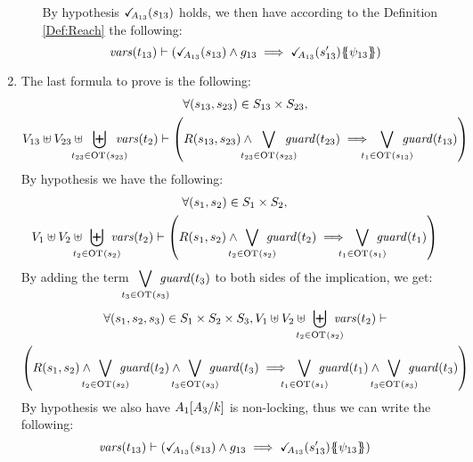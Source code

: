 \documentclass[runningheads]{llncs}
\begin{document}
\begin{enumerate}
\begin{itemize}
By hypothesis $\checkmark_{\!\! A_{13}}{\left(s_{13}\right)}$ holds,  we then have according to the Definition \ref{Def:Reach} the following:
\[ \fvars{t_{13}} \vdash \left(\reach{A_{13}}\mpar{s_{13}} \wedge g_{13} \implies \reach{A_{13}}\mpar{s_{13}'}\psubst{\psi_{13}}\right) \]	
\end{itemize}
\item The last formula to prove is the following:
\begin{multline*}
\forall \mpar{s_{13}, s_{23}} \in S_{13} \times S_{23},\\ V_{13} \uplus V_{23} \uplus \biguplus_\subbox{t_{23}\in \fOT{s_{23}}} \fvars{t_2} \vdash \left(R\mpar{s_{13}, s_{23}} \wedge \bigvee_\subbox{t_{23} \in \fOT{s_{23}}} \fguard{t_{23}} \implies \bigvee_\subbox{t_1 \in \fOT{s_{13}}} \fguard{t_{13}} \right)
\end{multline*}
By hypothesis we have the following:
\begin{multline*}
\forall \mpar{s_1, s_2} \in S_1 \times S_2,\\ V_1 \uplus V_2 \uplus \biguplus_\subbox{t_2 \in \fOT{s_2}} \fvars{t_2} \vdash \left(R\mpar{s_1, s_2} \wedge \bigvee_\subbox{t_2 \in \fOT{s_2}} \fguard{t_2} \implies \bigvee_\subbox{t_1 \in \fOT{s_1}} \fguard{t_1} \right)
\end{multline*}
By adding the term $\displaystyle{\bigvee_\subbox{t_3 \in \fOT{s_3}} \fguard{t_3}}$ to both sides of the implication, we get: 
\begin{multline*}
\forall \mpar{s_1, s_2,s_3} \in S_1 \times S_2 \times S_3, V_1 \uplus V_2 \uplus \biguplus_\subbox{t_2 \in \fOT{s_2}} \fvars{t_2} \vdash\\ \left(R\mpar{s_1, s_2} \wedge \bigvee_\subbox{t_2 \in \fOT{s_2}} \fguard{t_2} \wedge \bigvee_\subbox{t_3 \in \fOT{s_3}} \fguard{t_3} \implies \bigvee_\subbox{t_1 \in \fOT{s_1}} \fguard{t_1} \wedge \bigvee_\subbox{t_3 \in \fOT{s_3}} \fguard{t_3}\right)
\end{multline*}
By hypothesis we also have \(A_1{\left[A_3\middle/k\right]}\) is non-locking,  thus we can write the following:
\[ \fvars{t_{13}} \vdash \left(\reach{A_{13}}\mpar{s_{13}} \wedge g_{13} \implies \reach{A_{13}}\mpar{s_{13}'}\psubst{\psi_{13}}\right) \]	
\end{enumerate}




 
 
\end{document}
